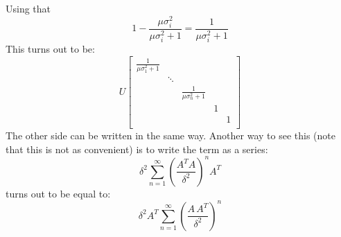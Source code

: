 Using that 
$$ 1- \frac{\mu \sigma_i^2}{\mu \sigma_i^2 +1} = \frac{1}{\mu\sigma_i^2 + 1}$$
This turns out to be:
\begin{equation*}
U\begin{bmatrix} \frac{1}{\mu\sigma_1^2 + 1} &        & & & \\
                                             & \ddots & & & \\
                                             & &\frac{1}{\mu\sigma_n^2 + 1}  & &\\
                                            &        &  &1& \\
                                            &        &  & &1 \\
\end{bmatrix}
\end{equation*}
The other side can be written in the same way. Another way to see this (note that this is not as convenient) is to write the term as a series:
$$\delta^2 \sum_{n=1}^\infty \left( \frac{A^T A}{\delta^2} \right)^n A^T $$
turns out to be equal to:
$$\delta^2 A^T \sum_{n=1}^\infty \left( \frac{A\, A^T}{\delta^2} \right)^n$$

